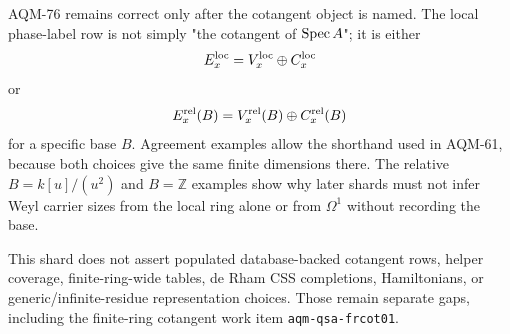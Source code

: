 AQM-76 remains correct only after the cotangent object is named.  The local
phase-label row is not simply "the cotangent of \(\operatorname{Spec} A\)"; it is either
\[
  E_x^{\rm loc}=V_x^{\rm loc}\oplus C_x^{\rm loc}
\]
or
\[
  E_x^{\rm rel}(B)=V_x^{\rm rel}(B)\oplus C_x^{\rm rel}(B)
\]
for a specific base \(B\).  Agreement examples allow the shorthand used in
AQM-61, because both choices give the same finite dimensions there.  The
relative \(B=k[u]/(u^2)\) and \(B=\mathbb Z\) examples show why later shards
must not infer Weyl carrier sizes from the local ring alone or from
\(\Omega^1\) without recording the base.

This shard does not assert populated database-backed cotangent rows, helper
coverage, finite-ring-wide tables, de Rham CSS completions, Hamiltonians, or
generic/infinite-residue representation choices.  Those remain separate gaps,
including the finite-ring cotangent work item \texttt{aqm-qsa-frcot01}.
